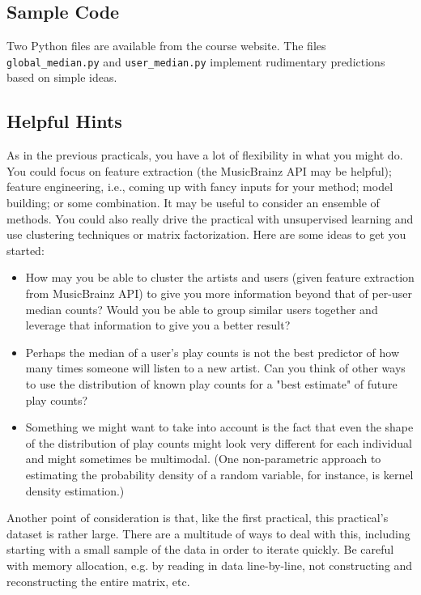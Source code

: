 \documentclass[12pt]{article}
\begin{document}
\subsection*{Sample Code}
Two Python files are available from the course website.  The files \verb|global_median.py| and \verb|user_median.py| implement rudimentary predictions based on simple ideas.

\subsection*{Helpful Hints} As in the previous practicals, you have a lot of flexibility in what you might do.  You could focus on feature extraction (the MusicBrainz API may be helpful); feature engineering, i.e., coming up with fancy inputs for your method; model building; or some combination. It may be useful to consider an ensemble of methods. You could also really drive the practical with unsupervised learning and use clustering techniques or matrix factorization. Here are some ideas to get you started:

\begin{itemize}
\item How may you be able to cluster the artists and users (given feature extraction from MusicBrainz API) to give you more information beyond that of per-user median counts? Would you be able to group similar users together and leverage that information to give you a better result?
\item Perhaps the median of a user's play counts is not the best predictor of how many times someone will listen to a new artist. Can you think of other ways to use the distribution of known play counts for a "best estimate" of future play counts? 
\item Something we might want to take into account is the fact that even the shape of the distribution of play counts might look very different for each individual and might sometimes be multimodal. (One non-parametric approach to estimating the probability density of a random variable, for instance, is kernel density estimation.)
\end{itemize}

Another point of consideration is that, like the first practical, this practical's dataset is rather large. There are a multitude of ways to deal with this, including starting with a small sample of the data in order to iterate quickly. Be careful with memory allocation, e.g. by reading in data line-by-line, not constructing and reconstructing the entire matrix, etc.
\end{document}
